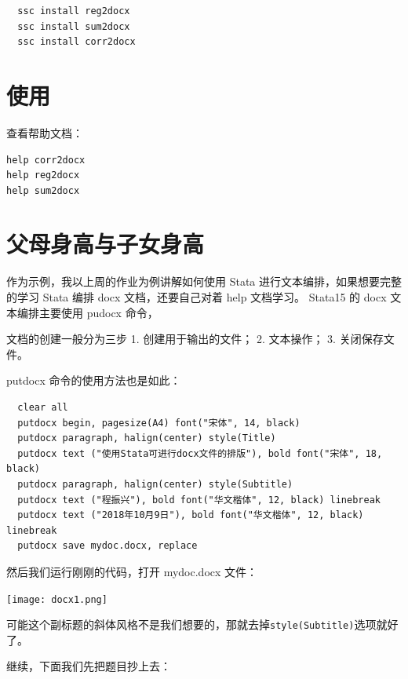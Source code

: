 \documentclass[cn,fancy,blue,11pt]{elegantbook}
\begin{document}
\begin{lstlisting}
  ssc install reg2docx
  ssc install sum2docx
  ssc install corr2docx
\end{lstlisting}

\hypertarget{section-41}{%
\section{使用}\label{section-41}}

查看帮助文档：

\begin{lstlisting}
help corr2docx
help reg2docx
help sum2docx
\end{lstlisting}

\hypertarget{section-42}{%
\section{父母身高与子女身高}\label{section-42}}

作为示例，我以上周的作业为例讲解如何使用 Stata 进行文本编排，如果想要完整的学习 Stata 编排 docx 文档，还要自己对着 help 文档学习。
Stata15 的 docx 文本编排主要使用 pudocx 命令，

文档的创建一般分为三步
1. 创建用于输出的文件；
2. 文本操作；
3. 关闭保存文件。

putdocx 命令的使用方法也是如此：

\begin{lstlisting}
  clear all
  putdocx begin, pagesize(A4) font("宋体", 14, black)
  putdocx paragraph, halign(center) style(Title)
  putdocx text ("使用Stata可进行docx文件的排版"), bold font("宋体", 18, black)
  putdocx paragraph, halign(center) style(Subtitle)
  putdocx text ("程振兴"), bold font("华文楷体", 12, black) linebreak
  putdocx text ("2018年10月9日"), bold font("华文楷体", 12, black) linebreak
  putdocx save mydoc.docx, replace
\end{lstlisting}

然后我们运行刚刚的代码，打开 mydoc.docx 文件：

\noindent\texttt{[image: docx1.png]}

可能这个副标题的斜体风格不是我们想要的，那就去掉\lstinline{style(Subtitle)}选项就好了。

继续，下面我们先把题目抄上去：
\end{document}
